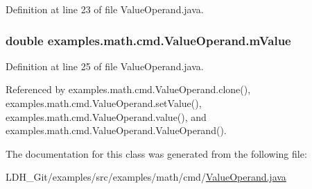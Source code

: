 Definition at line 23 of file Value\-Operand.\-java.

\hypertarget{classexamples_1_1math_1_1cmd_1_1_value_operand_a1b92e1db71532f1e9fc4d01ad004a6ab}{
\subsubsection[{m\-Value}]{\setlength{\rightskip}{0pt plus 5cm}double examples.\-math.\-cmd.\-Value\-Operand.\-m\-Value\hspace{0.3cm}{\ttfamily [private]}}}\label{classexamples_1_1math_1_1cmd_1_1_value_operand_a1b92e1db71532f1e9fc4d01ad004a6ab}


Definition at line 25 of file Value\-Operand.\-java.



Referenced by examples.\-math.\-cmd.\-Value\-Operand.\-clone(), examples.\-math.\-cmd.\-Value\-Operand.\-set\-Value(), examples.\-math.\-cmd.\-Value\-Operand.\-value(), and examples.\-math.\-cmd.\-Value\-Operand.\-Value\-Operand().



The documentation for this class was generated from the following file\-:\begin{DoxyCompactItemize}
\item 
L\-D\-H\-\_\-\-Git/examples/src/examples/math/cmd/\hyperlink{_value_operand_8java}{Value\-Operand.\-java}\end{DoxyCompactItemize}
